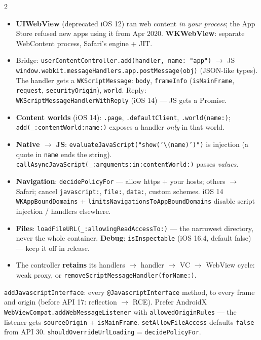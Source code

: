 \documentclass[8pt]{extarticle}
\newcommand\ct[1]{\texttt{#1}}
\newcommand\hd[1]{\par\vspace{3pt}\noindent{\bfseries\color{sheetBlue}#1}\par\vspace{1pt}}
\begin{document}
\begin{multicols}{2}
\raggedright{}

\hd{iOS}
\begin{itemize}
  \item \textbf{UIWebView} (deprecated iOS 12) ran web content \emph{in your process}; the App
        Store refused new apps using it from Apr 2020. \textbf{WKWebView}: separate WebContent
        process, Safari's engine + JIT.
  \item Bridge: \ct{userContentController.add(handler, name: "app")} $\to$ JS
        \ct{window.webkit.messageHandlers.app.postMessage(obj)} (JSON-like types). The handler gets
        a \ct{WKScriptMessage}: \ct{body}, \ct{frameInfo} (\ct{isMainFrame}, \ct{request},
        \ct{securityOrigin}), \ct{world}. Reply: \ct{WKScriptMessageHandlerWithReply} (iOS 14) —
        JS gets a Promise.
  \item \textbf{Content worlds} (iOS 14): \ct{.page}, \ct{.defaultClient}, \ct{.world(name:)};
        \ct{add(\_:contentWorld:name:)} exposes a handler \emph{only} in that world.
  \item \textbf{Native $\to$ JS}: \ct{evaluateJavaScript("show('\textbackslash(name)')")} is
        injection (a quote in \ct{name} ends the string).
        \ct{callAsyncJavaScript(\_:arguments:in:contentWorld:)} passes \emph{values}.
  \item \textbf{Navigation}: \ct{decidePolicyFor} — allow https + your hosts; others $\to$
        Safari; cancel \ct{javascript:}, \ct{file:}, \ct{data:}, custom schemes. iOS 14
        \ct{WKAppBoundDomains} + \ct{limitsNavigationsToAppBoundDomains} disable script
        injection / handlers elsewhere.
  \item \textbf{Files}: \ct{loadFileURL(\_:allowingReadAccessTo:)} — the narrowest directory,
        never the whole container. \textbf{Debug}: \ct{isInspectable} (iOS 16.4, default false) —
        keep it off in release.
  \item The controller \textbf{retains} its handlers $\to$ handler $\to$ VC $\to$ WebView cycle:
        weak proxy, or \ct{removeScriptMessageHandler(forName:)}.
\end{itemize}

\hd{Android}
\ct{addJavascriptInterface}: every \ct{@JavascriptInterface} method, to every frame and origin
(before API 17: reflection $\to$ RCE). Prefer AndroidX \ct{WebViewCompat.addWebMessageListener}
with \ct{allowedOriginRules} — the listener gets \ct{sourceOrigin} + \ct{isMainFrame}.
\ct{setAllowFileAccess} defaults \ct{false} from API 30. \ct{shouldOverrideUrlLoading}
= \ct{decidePolicyFor}.


\end{multicols}
\end{document}
